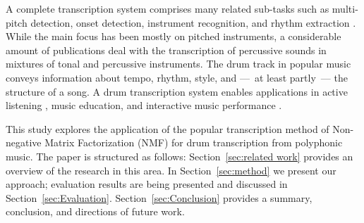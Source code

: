 \documentclass{article}
\newcommand{\secref}[1]{\mbox{Section~\ref{#1}}}
\begin{document}

A complete transcription system comprises many related sub-tasks such as multi-pitch detection, onset detection, instrument recognition, and rhythm extraction \cite{benetos_automatic_2013}. While the main focus has been mostly on pitched instruments, a considerable amount of publications deal with the transcription of percussive sounds in mixtures of tonal and percussive instruments. The drum track in popular music conveys information about tempo, rhythm, style, and ---~at least partly~--- the structure of a song. A drum transcription system enables applications in active listening \cite{yoshii_Drumix:_2007}, music education, and interactive music performance \cite{weinberg_interactive_2009}.


This study explores the application of the popular transcription method of Non-negative Matrix Factorization (NMF) for drum transcription from polyphonic music. The paper is structured as follows: \secref{sec:related work} provides an overview of the research in this area. In \secref{sec:method} we present our approach; evaluation results are being presented and discussed in \secref{sec:Evaluation}. \secref{sec:Conclusion} provides a summary, conclusion, and directions of future work. 

\vspace{-2mm}
\end{document}
